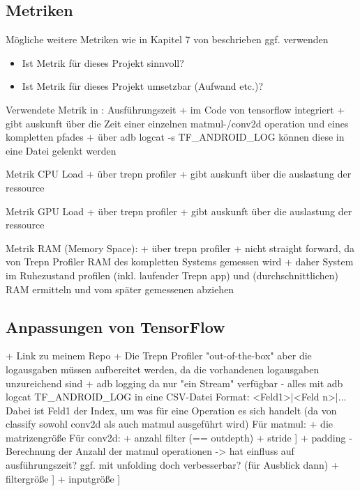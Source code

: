 \subsection{Metriken}
\label{subsec:metriken}
Mögliche weitere Metriken wie in Kapitel 7 von \cite{deepmon2017} beschrieben ggf. verwenden
\begin{itemize}
	\item{Ist Metrik für dieses Projekt sinnvoll?}
	\item{Ist Metrik für dieses Projekt umsetzbar (Aufwand etc.)?}
\end{itemize}

Verwendete Metrik in \cite{rstensorflow2017}: Ausführungszeit
	+ im Code von tensorflow integriert 
	+ gibt auskunft über die Zeit einer einzelnen matmul-/conv2d operation und eines kompletten pfades
	+ über adb logcat -s TF\_ANDROID\_LOG können diese in eine Datei gelenkt werden

Metrik CPU Load
	+ über trepn profiler
	+ gibt auskunft über die auslastung der ressource
	
Metrik GPU Load
	+ über trepn profiler
	+ gibt auskunft über die auslastung der ressource

Metrik RAM (Memory Space):
	+ über trepn profiler
	+ nicht straight forward, da von Trepn Profiler RAM des kompletten Systems gemessen wird
	+ daher System im Ruhezustand profilen (inkl. laufender Trepn app) und (durchschnittlichen) RAM ermitteln und vom später gemessenen abziehen


\subsection{Anpassungen von TensorFlow}
\label{subsec:anpassungentf}
+ Link zu meinem Repo
+ Die Trepn Profiler "out-of-the-box" aber die logausgaben müssen aufbereitet werden, da die vorhandenen logausgaben unzureichend sind
+ adb logging
da nur "ein Stream" verfügbar - alles mit adb logcat TF\_ANDROID\_LOG in eine CSV-Datei
Format: <Feld1>|<Feld n>|...
Dabei ist Feld1 der Index, um was für eine Operation es sich handelt (da von classify sowohl conv2d als auch matmul ausgeführt wird)
Für matmul:
+ die matrizengröße
Für conv2d:
+ anzahl filter (== outdepth)
+ stride		]
+ padding		- Berechnung der Anzahl der matmul operationen -> hat einfluss auf ausführungszeit? ggf. mit unfolding doch verbesserbar? (für Ausblick dann)
+ filtergröße	]
+ inputgröße	]



